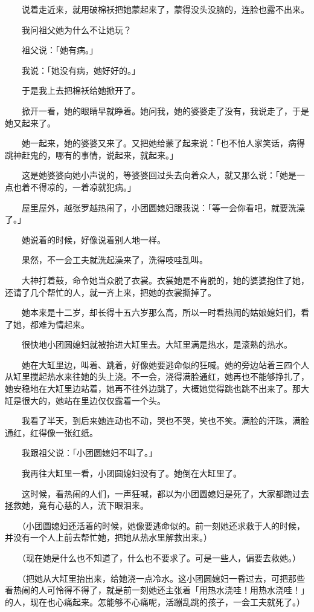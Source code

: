 \documentclass[UTF8]{ctexart}
\begin{document}
　　说着走近来，就用破棉袄把她蒙起来了，蒙得没头没脑的，连脸也露不出来。

　　我问祖父她为什么不让她玩？

　　祖父说：「她有病。」

　　我说：「她没有病，她好好的。」

　　于是我上去把棉袄给她掀开了。

　　掀开一看，她的眼睛早就睁着。她问我，她的婆婆走了没有，我说走了，于是她又起来了。

　　她一起来，她的婆婆又来了。又把她给蒙了起来说：「也不怕人家笑话，病得跳神赶鬼的，哪有的事情，说起来，就起来。」

　　这是她婆婆向她小声说的，等婆婆回过头去向着众人，就又那么说：「她是一点也着不得凉的，一着凉就犯病。」

　　屋里屋外，越张罗越热闹了，小团圆媳妇跟我说：「等一会你看吧，就要洗澡了。」

　　她说着的时候，好像说着别人地一样。

　　果然，不一会工夫就洗起澡来了，洗得吱哇乱叫。

　　大神打着鼓，命令她当众脱了衣裳。衣裳她是不肯脱的，她的婆婆抱住了她，还请了几个帮忙的人，就一齐上来，把她的衣裳撕掉了。

　　她本来是十二岁，却长得十五六岁那么高，所以一时看热闹的姑娘媳妇们，看了她，都难为情起来。

　　很快地小团圆媳妇就被抬进大缸里去。大缸里满是热水，是滚熟的热水。

　　她在大缸里边，叫着、跳着，好像她要逃命似的狂喊。她的旁边站着三四个人从缸里搅起热水来往她的头上浇。不一会，浇得满脸通红，她再也不能够挣扎了，她安稳地在大缸里边站着，她再不往外边跳了，大概她觉得跳也跳不出来了。那大缸是很大的，她站在里边仅仅露着一个头。

　　我看了半天，到后来她连动也不动，哭也不哭，笑也不笑。满脸的汗珠，满脸通红，红得像一张红纸。

　　我跟祖父说：「小团圆媳妇不叫了。」

　　我再往大缸里一看，小团圆媳妇没有了。她倒在大缸里了。

　　这时候，看热闹的人们，一声狂喊，都以为小团圆媳妇是死了，大家都跑过去拯救她，竟有心慈的人，流下眼泪来。

　　（小团圆媳妇还活着的时候，她像要逃命似的。前一刻她还求救于人的时候，并没有一个人上前去帮忙她，把她从热水里解救出来。）

　　（现在她是什么也不知道了，什么也不要求了。可是一些人，偏要去救她。）

　　（把她从大缸里抬出来，给她浇一点冷水。这小团圆媳妇一昏过去，可把那些看热闹的人可怜得不得了，就是前一刻她还主张着「用热水浇哇！用热水浇哇！」的人，现在也心痛起来。怎能够不心痛呢，活蹦乱跳的孩子，一会工夫就死了。）
\end{document}
